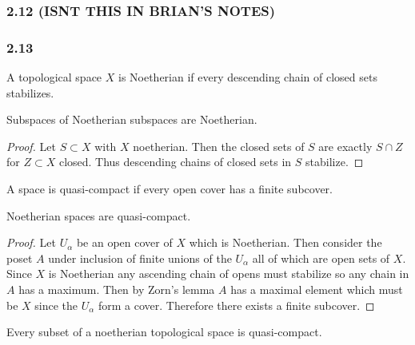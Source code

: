 \documentclass[12pt]{article}
\begin{document}
\subsubsection{2.12 (ISNT THIS IN BRIAN'S NOTES)}

\subsubsection{2.13}


\begin{defn}
A topological space $X$ is Noetherian if every descending chain of closed sets stabilizes.
\end{defn}

\begin{lemma}
Subspaces of Noetherian subspaces are Noetherian.
\end{lemma}

\begin{proof}
Let $S \subset X$ with $X$ noetherian. Then the closed sets of $S$ are exactly $S \cap Z$ for $Z \subset X$ closed. Thus descending chains of closed sets in $S$ stabilize.
\end{proof}

\begin{defn}
A space is quasi-compact if every open cover has a finite subcover.
\end{defn}

\begin{lemma}
Noetherian spaces are quasi-compact. 
\end{lemma}

\begin{proof}
Let $U_{\alpha}$ be an open cover of $X$ which is Noetherian. Then consider the poset $A$ under inclusion of finite unions of the $U_\alpha$ all of which are open sets of $X$. Since $X$ is Noetherian any ascending chain of opens must stabilize so any chain in $A$ has a maximum. Then by Zorn's lemma $A$ has a maximal element which must be $X$ since the $U_\alpha$ form a cover. Therefore there exists a finite subcover.
\end{proof}

\begin{cor}
Every subset of a noetherian topological space is quasi-compact.
\end{cor}
\end{document}

